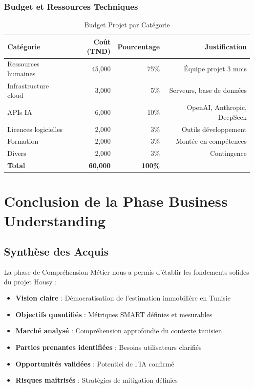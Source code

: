 \subsubsection{Budget et Ressources Techniques}

\begin{table}[H]
\centering
\caption{Budget Projet par Catégorie}
\begin{tabular}{|l|r|r|r|}
\hline
\textbf{Catégorie} & \textbf{Coût (TND)} & \textbf{Pourcentage} & \textbf{Justification} \\
\hline
Ressources humaines & 45,000 & 75\% & Équipe projet 3 mois \\
\hline
Infrastructure cloud & 3,000 & 5\% & Serveurs, base de données \\
\hline
APIs IA & 6,000 & 10\% & OpenAI, Anthropic, DeepSeek \\
\hline
Licences logicielles & 2,000 & 3\% & Outils développement \\
\hline
Formation & 2,000 & 3\% & Montée en compétences \\
\hline
Divers & 2,000 & 3\% & Contingence \\
\hline
\textbf{Total} & \textbf{60,000} & \textbf{100\%} & \\
\hline
\end{tabular}
\label{tab:budget_projet}
\end{table}

\section{Conclusion de la Phase Business Understanding}
\label{sec:conclusion_bu}

\subsection{Synthèse des Acquis}
\label{subsec:synthese_acquis}

La phase de Compréhension Métier nous a permis d'établir les fondements solides du projet Housy :

\begin{itemize}
    \item \textbf{Vision claire} : Démocratisation de l'estimation immobilière en Tunisie
    \item \textbf{Objectifs quantifiés} : Métriques SMART définies et mesurables
    \item \textbf{Marché analysé} : Compréhension approfondie du contexte tunisien
    \item \textbf{Parties prenantes identifiées} : Besoins utilisateurs clarifiés
    \item \textbf{Opportunités validées} : Potentiel de l'IA confirmé
    \item \textbf{Risques maîtrisés} : Stratégies de mitigation définies
\end{itemize}

